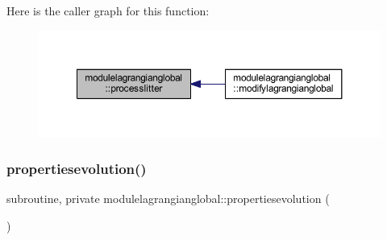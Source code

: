 Here is the caller graph for this function\+:\nopagebreak
\begin{figure}[H]
\begin{center}
\leavevmode
\includegraphics[width=350pt]{namespacemodulelagrangianglobal_ae943a682fa588e08202185a107d59f97_icgraph}
\end{center}
\end{figure}
\mbox{\label{namespacemodulelagrangianglobal_ad41aee81fdf2c272327a709b9f90d33b}} 
\subsubsection{\texorpdfstring{propertiesevolution()}{propertiesevolution()}}
{\footnotesize\ttfamily subroutine, private modulelagrangianglobal\+::propertiesevolution (\begin{DoxyParamCaption}{ }\end{DoxyParamCaption})\hspace{0.3cm}{\ttfamily [private]}}

